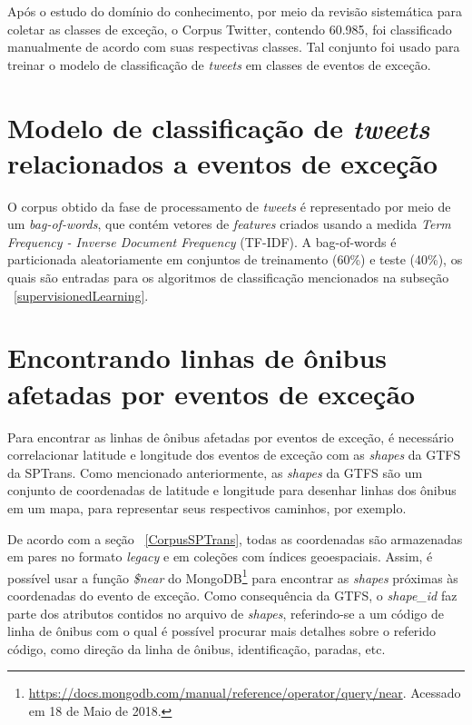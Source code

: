 \documentclass[
	12pt,				%
	oneside,			%
	a4paper,			%
	english,			%
	brazil				%
	]{abntex2ppgsi}
\begin{document}
Após o estudo do domínio do conhecimento, por meio da revisão sistemática para coletar as classes de exceção, o Corpus Twitter, contendo 60.985, foi classificado manualmente de acordo com suas respectivas classes. Tal conjunto foi usado para treinar o modelo de classificação de \textit{tweets} em classes de eventos de exceção. 

\section{Modelo de classificação de \textit{tweets} relacionados a eventos de exceção}
\label{model}

O corpus obtido da fase de processamento de \textit {tweets} é representado por meio de um \textit{bag-of-words}, que contém vetores de \textit{features} criados usando a medida \textit{Term Frequency - Inverse Document Frequency} (TF-IDF). A bag-of-words é particionada aleatoriamente em conjuntos de treinamento (60\%) e teste (40\%), os quais são entradas para os algoritmos de classificação mencionados na subseção ~\ref{supervisionedLearning}.

\section{Encontrando linhas de ônibus afetadas por eventos de exceção}

Para encontrar as linhas de ônibus afetadas por eventos de exceção, é necessário correlacionar latitude e longitude dos eventos de exceção com as \textit{shapes} da GTFS da SPTrans. Como mencionado anteriormente, as \textit{shapes} da GTFS são um conjunto de coordenadas de latitude e longitude para desenhar linhas dos ônibus em um mapa, para representar seus respectivos caminhos, por exemplo.

De acordo com a seção ~\ref{CorpusSPTrans}, todas as coordenadas são armazenadas em pares no formato \textit{legacy} e em coleções com índices geoespaciais. Assim, é possível usar a função \textit{\$near} do MongoDB\footnote {\url{https://docs.mongodb.com/manual/reference/operator/query/near}. Acessado em 18 de Maio de 2018.} para encontrar as \textit{shapes} próximas às coordenadas do evento de exceção. Como consequência da GTFS, o \textit{shape\_id} faz parte dos atributos contidos no arquivo de \textit{shapes}, referindo-se a um código de linha de ônibus com o qual é possível procurar mais detalhes sobre o referido código, como direção da linha de ônibus, identificação, paradas, etc.
\end{document}
